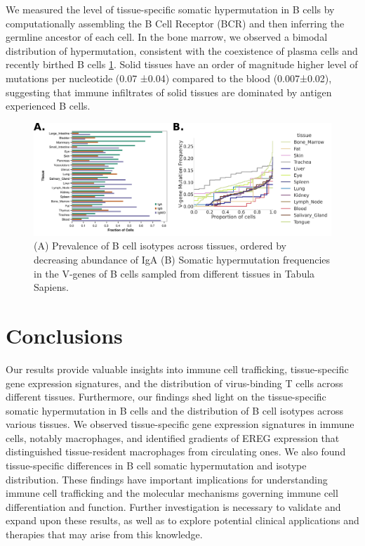We measured the level of tissue-specific somatic hypermutation in B cells by computationally assembling the B Cell Receptor (BCR) and then inferring the germline ancestor of each cell\cite{lindeman2018bracer,gupta2015change}. In the bone marrow, we observed a bimodal distribution of hypermutation, consistent with the coexistence of plasma cells and recently birthed B cells \ref{fig:paper1_igh}. Solid tissues have an order of magnitude higher level of mutations per nucleotide (0.07 ±0.04) compared to the blood (0.007±0.02), suggesting that immune infiltrates of solid tissues are dominated by antigen experienced B cells.

\begin{figure}[hbt!]
\centering
\includegraphics[width=14cm, keepaspectratio]{figs/paper1/fig3_tabula_igh.png}
\caption[Tissue population-level parameters of B cell Dynamics.]{(A) Prevalence of B cell isotypes across tissues, ordered by decreasing abundance of IgA (B) Somatic hypermutation frequencies in the V-genes of B cells sampled from different tissues in
Tabula Sapiens.}
\label{fig:paper1_igh}
\end{figure}

\section{Conclusions}

Our results provide valuable insights into immune cell trafficking, tissue-specific gene expression signatures, and the distribution of virus-binding T cells across different tissues. Furthermore, our findings shed light on the tissue-specific somatic hypermutation in B cells and the distribution of B cell isotypes across various tissues.
We observed tissue-specific gene expression signatures in immune cells, notably macrophages, and identified gradients of EREG expression that distinguished tissue-resident macrophages from circulating ones. We also found tissue-specific differences in B cell somatic hypermutation and isotype distribution.
These findings have important implications for understanding immune cell trafficking and the molecular mechanisms governing immune cell differentiation and function. Further investigation is necessary to validate and expand upon these results, as well as to explore potential clinical applications and therapies that may arise from this knowledge.

